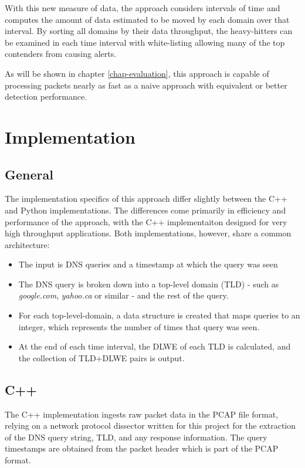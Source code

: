 \documentclass[12pt]{report}
\theoremstyle{remark}
\theoremstyle{definition}
\theoremstyle{definition}
\theoremstyle{definition}
\begin{document}
With this new measure of data, the approach considers intervals of time and
computes the amount of data estimated to be moved by each domain over that
interval. By sorting all domains by their data throughput, the heavy-hitters can
be examined in each time interval with white-listing allowing many of the top
contenders from causing alerts.

As will be shown in chapter \ref{chap-evaluation}, this approach is capable of
processing packets nearly as fast as a naive approach with equivalent or better
detection performance.

\section{Implementation}
\label{implementation}
\subsection{General}

The implementation specifics of this approach differ slightly between the C++
and Python implementations. The differences come primarily in efficiency and
performance of the approach, with the C++ implementaiton designed for very high
throughput applications. Both implementations, however, share a common
architecture:

\begin{itemize}
\item The input is DNS queries and a timestamp at which the query was seen
\item The DNS query is broken down into a top-level domain (TLD) - such as
\emph{google.com}, \emph{yahoo.ca} or similar - and the rest of the query.
\item For each top-level-domain, a data structure is created that maps queries
to an integer, which represents the number of times that query was seen.
\item At the end of each time interval, the DLWE of each TLD is calculated, and
the collection of TLD+DLWE pairs is output.
\end{itemize}

\subsection{C++}
\label{cpp-implementation}
The C++ implementation ingests raw packet data in the PCAP file
format, relying on a network protocol dissector written for this project for the
extraction of the DNS query string, TLD, and any response information. The query
timestamps are obtained from the packet header which is part of the PCAP format.
\end{document}
